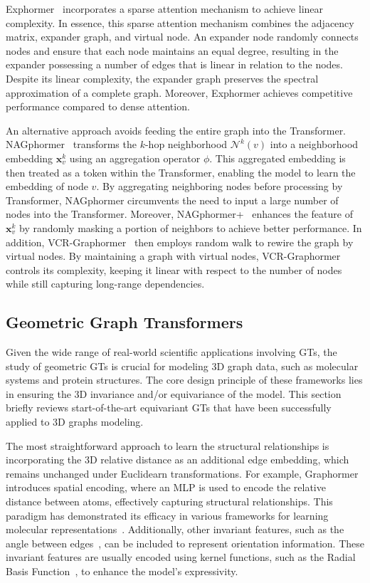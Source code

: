 Exphormer~\cite{shirzad2023exphormer} incorporates a sparse attention mechanism to achieve linear complexity. In essence, this sparse attention mechanism combines the adjacency matrix, expander graph, and virtual node. An expander node randomly connects nodes and ensure that each node maintains an equal degree, resulting in the expander possessing a number of edges that is linear in relation to the nodes. Despite its linear complexity, the expander graph preserves the spectral approximation of a complete graph. Moreover, Exphormer achieves competitive performance compared to dense attention.

An alternative approach avoids feeding the entire graph into the Transformer. NAGphormer~\cite{NAGphormer} transforms the $k$-hop neighborhood $\mathcal{N}^{k}(v)$ into a neighborhood embedding $\mathbf{x}^k_v$ using an aggregation operator $\phi$. This aggregated embedding is then treated as a token within the Transformer, enabling the model to learn the embedding of node $v$.
By aggregating neighboring nodes before processing by Transformer, NAGphormer circumvents the need to input a large number of nodes into the Transformer. Moreover, NAGphormer+~\cite{NAGphormer+} enhances the feature of $\mathbf{x}^k_v$ by randomly masking a portion of neighbors to achieve better performance. 
In addition, VCR-Graphormer~\cite{fu2024vcrgraphormer} then employs random walk to rewire the graph by virtual nodes. By maintaining a graph with virtual nodes, VCR-Graphormer controls its complexity, keeping it linear with respect to the number of nodes while still capturing long-range dependencies.



\subsection{Geometric Graph Transformers}
\label{architecture:Equivariance}
Given the wide range of real-world scientific applications involving GTs, the study of geometric GTs is crucial for modeling 3D graph data,  such as molecular systems and protein structures.
The core design principle of these frameworks lies in ensuring the 3D invariance and/or equivariance of the model. 
This section briefly reviews start-of-the-art  equivariant GTs that have been successfully applied to 3D graphs modeling.

The most straightforward approach to learn the structural relationships is incorporating the 3D relative distance as an additional edge embedding, which remains unchanged under Euclidearn transformations.
For example, Graphormer~\cite{Graphormer} introduces spatial encoding, where an MLP is used to encode the relative distance between atoms, effectively capturing structural relationships. 
This paradigm has demonstrated its efficacy in various frameworks for learning molecular representations~\cite{zhou2023unimol}. 
Additionally, other invariant features, such as the angle between edges~\cite{yan2022periodic}, can be included to represent orientation information. These invariant features are usually encoded using kernel functions, such as the Radial Basis Function~\cite{choudhary2021atomistic}, to enhance the model's expressivity.

